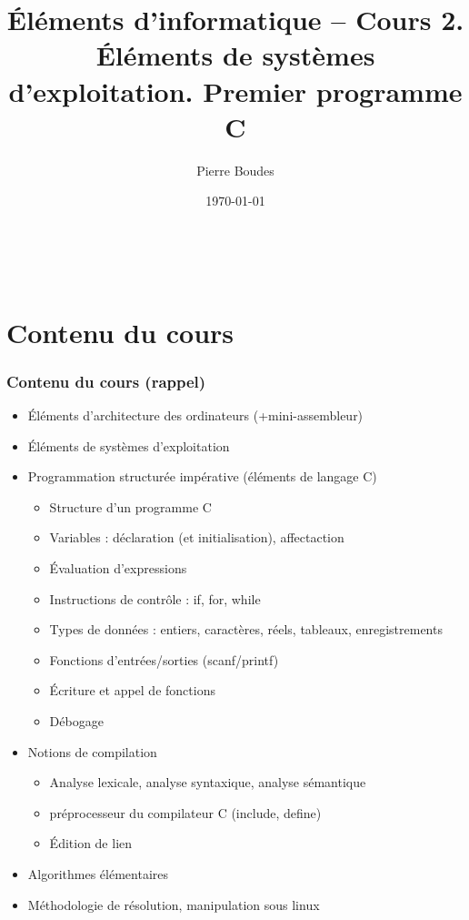 \documentclass[xcolor=svgnames]{beamer}
\title{Éléments d'informatique -- Cours 2. Éléments de systèmes
  d'exploitation. Premier programme C}
\author{Pierre Boudes}
\date{\today}
\begin{document}
\begin{frame}
	\titlepage
	\vfill
	\begin{center}
		\\[2.5ex]
		{\tiny\CcNote{\CcLongnameByNcSa}}
		\vspace*{-2.5ex}
	\end{center}
\end{frame}

  \section*{Contenu du cours}
\begin{frame}
  \frametitle{Contenu du cours (rappel)}
  \begin{itemize}
  \item Éléments d'architecture des ordinateurs (+mini-assembleur)
  \item \alert{Éléments de systèmes d'exploitation}
\item Programmation structurée impérative (éléments de langage C)
\begin{itemize}
  \item Structure d'un programme C
  \item Variables : déclaration (et initialisation), affectaction
  \item Évaluation d'expressions
  \item Instructions de contrôle : if, for, while
  \item Types de données : entiers, caractères,
    réels, tableaux, enregistrements
  \item Fonctions d'entrées/sorties (scanf/printf)
  \item Écriture et appel de fonctions
  \item Débogage
\end{itemize}
\item Notions de compilation
  \begin{itemize}
  \item Analyse lexicale, analyse syntaxique, analyse sémantique
  \item préprocesseur du compilateur C (include, define)
   \item Édition de lien
  \end{itemize}
\item Algorithmes élémentaires
\item Méthodologie de résolution, manipulation sous linux
\end{itemize}
\end{frame}
\end{document}
